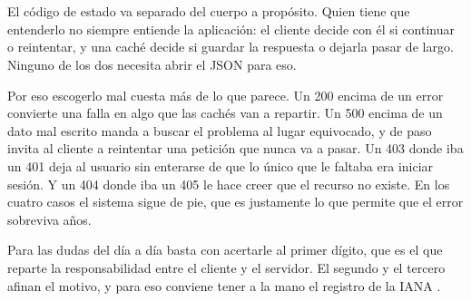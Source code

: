 \documentclass[10pt,a4paper]{article}
\begin{document}
\section{\color{colorIPN}{Conclusión}}

El código de estado va separado del cuerpo a propósito. Quien tiene que entenderlo no siempre entiende la aplicación: el cliente decide con él si continuar o reintentar, y una caché decide si guardar la respuesta o dejarla pasar de largo. Ninguno de los dos necesita abrir el JSON para eso.

Por eso escogerlo mal cuesta más de lo que parece. Un 200 encima de un error convierte una falla en algo que las cachés van a repartir. Un 500 encima de un dato mal escrito manda a buscar el problema al lugar equivocado, y de paso invita al cliente a reintentar una petición que nunca va a pasar. Un 403 donde iba un 401 deja al usuario sin enterarse de que lo único que le faltaba era iniciar sesión. Y un 404 donde iba un 405 le hace creer que el recurso no existe. En los cuatro casos el sistema sigue de pie, que es justamente lo que permite que el error sobreviva años.

Para las dudas del día a día basta con acertarle al primer dígito, que es el que reparte la responsabilidad entre el cliente y el servidor. El segundo y el tercero afinan el motivo, y para eso conviene tener a la mano el registro de la IANA \cite{iana_status}.


\pagebreak

\section{\color{colorIPN}{Referencias Bibliográficas}}
\nocite{*}
\color{colorESCOM}{
	\printbibliography[heading=none]
}
\end{document}
